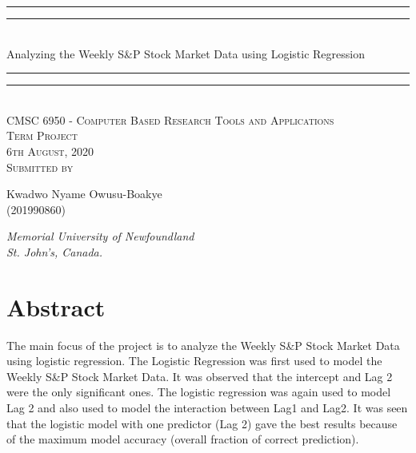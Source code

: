 \documentclass[12pt]{article}
\begin{document}
{\centering

\rule{\textwidth}{1.6pt}\vspace*{-\baselineskip}\vspace*{2pt} 
\rule{\textwidth}{0.4pt}\\[\baselineskip] 
{\LARGE Analyzing the Weekly S\&P Stock Market Data using Logistic Regression}
\rule{\textwidth}{0.4pt}\vspace*{-\baselineskip}\vspace{3.2pt}
\rule{\textwidth}{1.6pt}\\[\baselineskip] 

\vspace{20mm} %
\scshape %
CMSC 6950 - Computer Based Research Tools and Applications \\ [\baselineskip]
Term Project \\[\baselineskip] 
6th August, 2020 \\[\baselineskip] 
\vspace{20mm} %
Submitted by \\[\baselineskip]
{\Large Kwadwo Nyame Owusu-Boakye \\ (201990860) \par}
\vfill
{\itshape Memorial University of Newfoundland \\ St. John's, Canada.\par} 
}

\newpage

{\centering
  \section*{Abstract}
}
The main focus of the project is to analyze the Weekly S\&P Stock Market Data using logistic regression. The Logistic Regression was first used to model the Weekly S\&P Stock Market Data. It was observed that the intercept and Lag 2 were the only significant ones. The logistic regression was again used to model Lag 2 and also used to model the interaction between Lag1 and Lag2. It was seen that the logistic model with one predictor (Lag 2) gave the  best results because of the maximum model accuracy (overall fraction of correct prediction).
\end{document}
